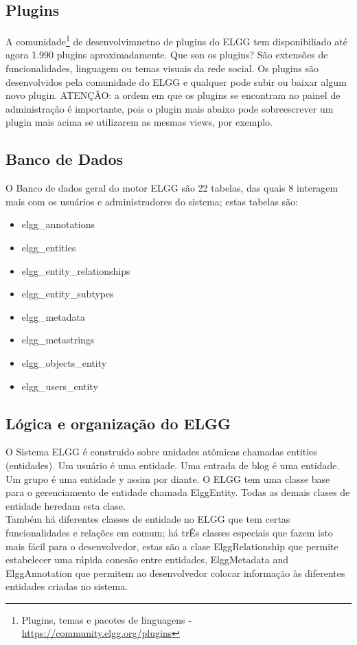 \documentclass[12pt, letterpaper, onecolumn]{article}
\begin{document}
\subsection{Plugins}
A comunidade\footnote{ Plugins, temas e pacotes de linguagens -  \url{https://community.elgg.org/plugins}} de desenvolvimnetno de plugins do ELGG tem disponibiliado até agora 1.990 plugins aproximadamente. Que son os plugins? São extensões de funcionalidades, linguagem ou temas visuais da rede social. Os plugins são desenvolvidos pela comunidade do ELGG e qualquer pode subir ou baixar algum novo plugin. ATENÇÃO: a ordem em que os plugins se encontram no painel de administração é importante, pois o plugin mais abaixo pode sobreescrever um plugin mais acima se utilizarem as mesmas views, por exemplo.

\subsection{Banco de Dados}
O Banco de dados geral do motor ELGG são 22 tabelas, das quais 8 interagem mais com os usuários e administradores do sistema; estas tabelas são:
\begin{itemize}
\item elgg\_annotations
\item elgg\_entities
\item elgg\_entity\_relationships
\item elgg\_entity\_subtypes
\item elgg\_metadata
\item elgg\_metastrings
\item elgg\_objects\_entity
\item elgg\_users\_entity
\end{itemize}

\subsection{Lógica e organização do ELGG}
O Sistema ELGG é construido sobre unidades atômicas chamadas entities (entidades). Um usuário é uma entidade. Uma entrada de blog é uma entidade. Um grupo é uma entidade y assim por diante. O ELGG tem uma classe base para o gerenciamento de entidade chamada ElggEntity. Todas as demais clases de entidade heredam esta clase.\\

Também há diferentes classes de entidade no ELGG que tem certas funcionalidades e relações em comum; há trÊs classes especiais que fazem isto mais fácil para o desenvolvedor, estas são a clase ElggRelationship que permite estabelecer uma rápida  conesão entre entidades, ElggMetadata and ElggAnnotation que permitem ao desenvolvedor colocar informação às diferentes entidades criadas no sistema.\\
\end{document}
